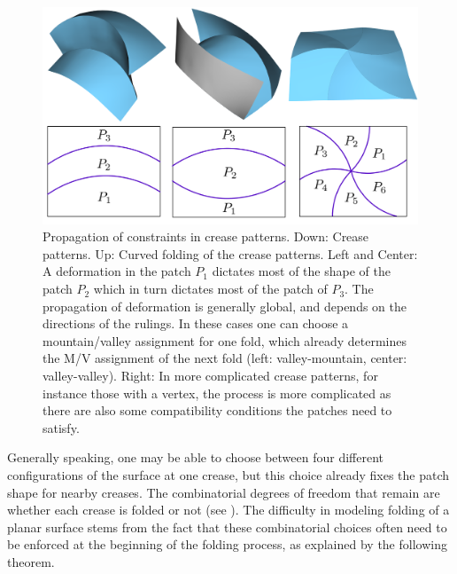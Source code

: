 \begin{figure} [h]
	\centering
	\includegraphics[width=\linewidth]{figures/multiple_crease_patterns}
	\caption{Propagation of constraints in crease patterns. Down: Crease patterns. Up: Curved folding of the crease patterns. Left and Center: A deformation in the patch $P_1$ dictates most of the shape of the patch $P_2$ which in turn dictates most of the patch of $P_3$. The propagation of deformation is generally global, and depends on the directions of the rulings. In these cases one can choose a mountain/valley assignment for one fold, which already determines the M/V assignment of the next fold (left: valley-mountain, center: valley-valley). Right: In more complicated crease patterns, for instance those with a vertex, the process is more complicated as there are also some compatibility conditions the patches need to satisfy. }
	\label{fig:multiple_crease_patterns}
\end{figure}

Generally speaking, one may be able to choose between four different configurations of the surface at one crease, but this choice already fixes the patch shape for nearby creases. The combinatorial degrees of freedom that remain are whether each crease is folded or not (see ). The difficulty in modeling folding of a planar surface stems from the fact that these combinatorial choices often need to be enforced at the beginning of the folding process, as explained by the following theorem.%


